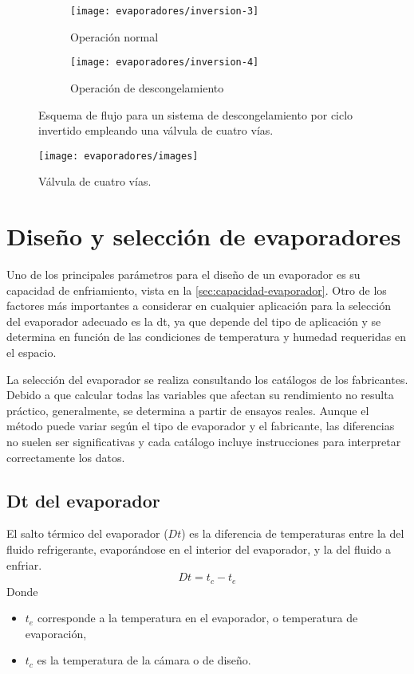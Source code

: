 		
		\begin{figure}[h]
			\begin{subfigure}{.35\linewidth}
				\texttt{[image: evaporadores/inversion-3]}
				\caption{Operación normal}
				\label{fig:inversion-3}
			\end{subfigure}
			
			\begin{subfigure}{.35\linewidth}
				\texttt{[image: evaporadores/inversion-4]}
				\caption{Operación de descongelamiento}
				\label{fig:inversion-4}
			\end{subfigure}
			\caption{Esquema de flujo para un sistema de descongelamiento por ciclo invertido empleando una válvula de cuatro vías.}
			\label{fig:deshielo-bomba-calor}
		\end{figure} 
		\begin{figure}[h]
			\centering\caption{Válvula de cuatro vías.}
			\texttt{[image: evaporadores/images]}
			\label{fig:valvula-4-vias}
		\end{figure}
		
	\section{Diseño y selección de evaporadores}
		
		Uno de los principales parámetros para el diseño de un evaporador es su capacidad de enfriamiento, vista en la \autoref{sec:capacidad-evaporador}. Otro de los factores más importantes a considerar en cualquier aplicación para la selección del evaporador adecuado es la \acrlong{dt}, ya que depende del tipo de aplicación y se determina en función de las condiciones de temperatura y humedad requeridas en el espacio.
		
		
		La selección del evaporador se realiza consultando los catálogos de los fabricantes. Debido a que calcular todas las variables que afectan su rendimiento no resulta práctico, generalmente, se determina a partir de ensayos reales. Aunque el método puede variar según el tipo de evaporador y el fabricante, las diferencias no suelen ser significativas y cada catálogo incluye instrucciones para interpretar correctamente los datos.
		
		\subsection{Dt del evaporador}
		
		El salto térmico del evaporador ($Dt$) es la diferencia de temperaturas entre la del fluido refrigerante, evaporándose en el interior del evaporador, y la del fluido a enfriar. 
		\begin{equation}
			Dt = t_c - t_e
		\end{equation}
		Donde 
		\begin{itemize}
			\item $t_e$ corresponde a la temperatura en el evaporador, o temperatura de evaporación,
			\item $t_c$ es la temperatura de la cámara o de diseño.
		\end{itemize}
		

